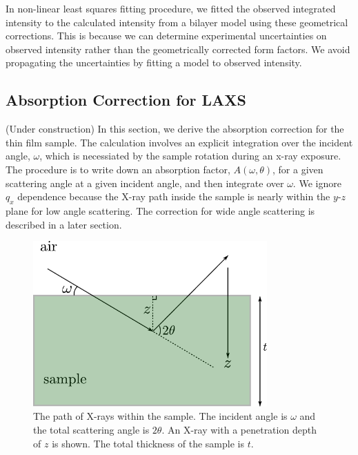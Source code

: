 In non-linear least squares fitting procedure, 
we fitted the observed integrated intensity to
the calculated intensity from a bilayer model using these geometrical corrections. 
This is because we can determine experimental uncertainties
on observed intensity rather than the geometrically corrected form factors. 
We avoid propagating the uncertainties by fitting a model to observed intensity. 

\subsection{Absorption Correction for LAXS}
(Under construction)
In this section, we derive the absorption correction for the thin film
sample. The calculation involves an explicit integration over the incident angle, 
$\omega$, which is necessiated by the sample rotation during an x-ray exposure. 
The procedure is to write down an absorption factor, $A(\omega,\theta)$, for a 
given scattering angle at a given incident angle, and
then integrate over $\omega$. We ignore $q_x$ dependence because the X-ray
path inside the sample is nearly within the $y$-$z$ plane for low angle
scattering. The correction for wide angle scattering is described in a later
section.

\begin{figure}[htbp]
  \centering
  \includegraphics[width=0.8\textwidth]{figures/ripple/absorption_LAXS}
  \caption{The path of X-rays within the sample. The incident angle is 
  $\omega$ and the total scattering angle is $2\theta$. An X-ray with a
  penetration depth of $z$ is shown. The total thickness of the sample
  is $t$.}
  \label{fig:absorption_LAXS}
\end{figure}


